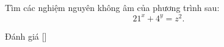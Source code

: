 \ifshowproblem
\begin{problem}\label{problem:ROU-2015-JBMO-TST-D1-P4}
    Tìm các nghiệm nguyên không âm của phương trình sau:  
    \[ 21^x + 4^y = z^2. \] 
\end{problem}
\fi

\ifshowinfo
Đánh giá [\textbf{}]\footnotemark
{}
\fi